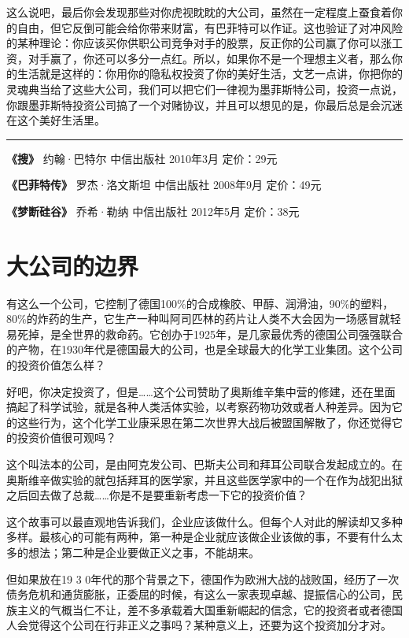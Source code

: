 这么说吧，最后你会发现那些对你虎视眈眈的大公司，虽然在一定程度上蚕食着你的自由，但它反倒可能会给你带来财富，有巴菲特可以作证。这也验证了对冲风险的某种理论：你应该买你供职公司竞争对手的股票，反正你的公司赢了你可以涨工资，对手赢了，你还可以多分一点红。所以，如果你不是一个理想主义者，那么你的生活就是这样的：你用你的隐私权投资了你的美好生活，文艺一点讲，你把你的灵魂典当给了这些大公司，我们可以把它们一律视为墨菲斯特公司，投资一点说，你跟墨菲斯特投资公司搞了一个对赌协议，并且可以想见的是，你最后总是会沉迷在这个美好生活里。

\begin{center}\rule{0.5\linewidth}{0.5pt}\end{center}

\textbf{《搜》} 约翰·巴特尔 中信出版社 2010年3月 定价：29元

\textbf{《巴菲特传》} 罗杰·洛文斯坦 中信出版社 2008年9月 定价：49元

\textbf{《梦断硅谷》} 乔希·勒纳 中信出版社 2012年5月 定价：38元

\hypertarget{ux5927ux516cux53f8ux7684ux8fb9ux754c}{%
\section{大公司的边界}\label{ux5927ux516cux53f8ux7684ux8fb9ux754c}}

有这么一个公司，它控制了德国100\%的合成橡胶、甲醇、润滑油，90\%的塑料，80\%的炸药的生产，它生产一种叫阿司匹林的药片让人类不大会因为一场感冒就轻易死掉，是全世界的救命药。它创办于1925年，是几家最优秀的德国公司强强联合的产物，在1930年代是德国最大的公司，也是全球最大的化学工业集团。这个公司的投资价值怎么样？

好吧，你决定投资了，但是\ldots\ldots 这个公司赞助了奥斯维辛集中营的修建，还在里面搞起了科学试验，就是各种人类活体实验，以考察药物功效或者人种差异。因为它的这些行为，这个化学工业康采恩在第二次世界大战后被盟国解散了，你还觉得它的投资价值很可观吗？

这个叫法本的公司，是由阿克发公司、巴斯夫公司和拜耳公司联合发起成立的。在奥斯维辛做实验的就包括拜耳的医学家，并且这些医学家中的一个在作为战犯出狱之后回去做了总裁\ldots\ldots 你是不是要重新考虑一下它的投资价值？

这个故事可以最直观地告诉我们，企业应该做什么。但每个人对此的解读却又多种多样。最核心的可能有两种，第一种是企业就应该做企业该做的事，不要有什么太多的想法；第二种是企业要做正义之事，不能胡来。

但如果放在19 3
0年代的那个背景之下，德国作为欧洲大战的战败国，经历了一次债务危机和通货膨胀，正委屈的时候，有这么一家表现卓越、提振信心的公司，民族主义的气概当仁不让，差不多承载着大国重新崛起的信念，它的投资者或者德国人会觉得这个公司在行非正义之事吗？某种意义上，还要为这个投资加分才对。

